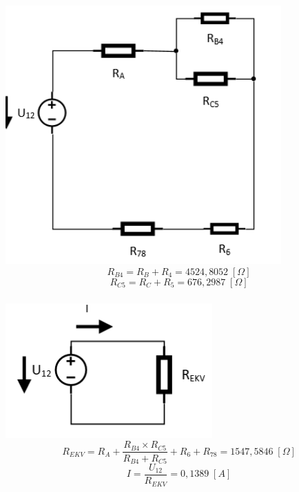 \documentclass[a4paper,12pt]{article}
\begin{document}
		\subsubsection{} %
			\includegraphics[width=400px]{1_3.png}
			\begin{equation}
				R_{B4} = R_B + R_4 = 4524,8052 \;[\Omega]\nonumber
			\end{equation}
			\begin{equation}
				R_{C5} = R_C + R_5 = 676,2987 \;[\Omega] \nonumber
			\end{equation}
		\subsubsection{} %
			\includegraphics[width=300px]{1_4.png}
			\begin{equation}
				R_{EKV} = R_A + \frac{R_{B4} \times R_{C5}}{R_{B4} + R_{C5}} + R_6 + R_{78} = 1 547,5846 \;[\Omega]\nonumber
			\end{equation}
			\begin{equation}
				I = \frac{U_{12}}{R_{EKV}} = 0,1389 \;[A]\nonumber
			\end{equation}
\end{document}

